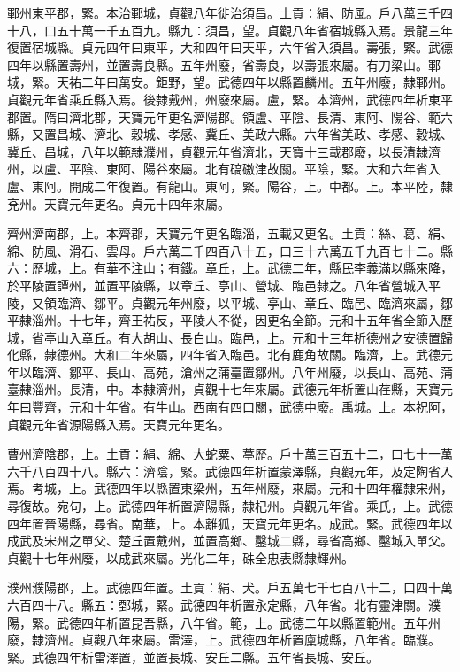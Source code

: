 \begin{pinyinscope}
 鄆州東平郡，緊。本治鄆城，貞觀八年徙治須昌。土貢：絹、防風。戶八萬三千四十八，口五十萬一千五百九。縣九：須昌，望。貞觀八年省宿城縣入焉。景龍三年復置宿城縣。貞元四年曰東平，大和四年曰天平，六年省入須昌。壽張，緊。武德四年以縣置壽州，並置壽良縣。五年州廢，省壽良，以壽張來屬。有刀梁山。鄆城，緊。天祐二年曰萬安。鉅野，望。武德四年以縣置麟州。五年州廢，隸鄆州。貞觀元年省乘丘縣入焉。後隸戴州，州廢來屬。盧，緊。本濟州，武德四年析東平郡置。隋曰濟北郡，天寶元年更名濟陽郡。領盧、平陰、長清、東阿、陽谷、範六縣，又置昌城、濟北、穀城、孝感、冀丘、美政六縣。六年省美政、孝感、穀城、冀丘、昌城，八年以範隸濮州，貞觀元年省濟北，天寶十三載郡廢，以長清隸濟州，以盧、平陰、東阿、陽谷來屬。北有碻磝津故關。平陰，緊。大和六年省入盧、東阿。開成二年復置。有龍山。東阿，緊。陽谷，上。中都。上。本平陸，隸兗州。天寶元年更名。貞元十四年來屬。



 齊州濟南郡，上。本齊郡，天寶元年更名臨淄，五載又更名。土貢：絲、葛、絹、綿、防風、滑石、雲母。戶六萬二千四百八十五，口三十六萬五千九百七十二。縣六：歷城，上。有華不注山；有鐵。章丘，上。武德二年，縣民李義滿以縣來降，於平陵置譚州，並置平陵縣，以章丘、亭山、營城、臨邑隸之。八年省營城入平陵，又領臨濟、鄒平。貞觀元年州廢，以平城、亭山、章丘、臨邑、臨濟來屬，鄒平隸淄州。十七年，齊王祐反，平陵人不從，因更名全節。元和十五年省全節入歷城，省亭山入章丘。有大胡山、長白山。臨邑，上。元和十三年析德州之安德置歸化縣，隸德州。大和二年來屬，四年省入臨邑。北有鹿角故關。臨濟，上。武德元年以臨濟、鄒平、長山、高苑，滄州之蒲臺置鄒州。八年州廢，以長山、高苑、蒲臺隸淄州。長清，中。本隸濟州，貞觀十七年來屬。武德元年析置山荏縣，天寶元年曰豐齊，元和十年省。有牛山。西南有四口關，武德中廢。禹城。上。本祝阿，貞觀元年省源陽縣入焉。天寶元年更名。



 曹州濟陰郡，上。土貢：絹、綿、大蛇粟、葶歷。戶十萬三百五十二，口七十一萬六千八百四十八。縣六：濟陰，緊。武德四年析置蒙澤縣，貞觀元年，及定陶省入焉。考城，上。武德四年以縣置東梁州，五年州廢，來屬。元和十四年權隸宋州，尋復故。宛句，上。武德四年析置濟陽縣，隸杞州。貞觀元年省。乘氏，上。武德四年置晉陽縣，尋省。南華，上。本離狐，天寶元年更名。成武。緊。武德四年以成武及宋州之單父、楚丘置戴州，並置高鄉、鑿城二縣，尋省高鄉、鑿城入單父。貞觀十七年州廢，以成武來屬。光化二年，硃全忠表縣隸輝州。



 濮州濮陽郡，上。武德四年置。土貢：絹、犬。戶五萬七千七百八十二，口四十萬六百四十八。縣五：鄄城，緊。武德四年析置永定縣，八年省。北有靈津關。濮陽，緊。武德四年析置昆吾縣，八年省。範，上。武德二年以縣置範州。五年州廢，隸濟州。貞觀八年來屬。雷澤，上。武德四年析置廩城縣，八年省。臨濮。緊。武德四年析雷澤置，並置長城、安丘二縣。五年省長城、安丘。




\end{pinyinscope}
